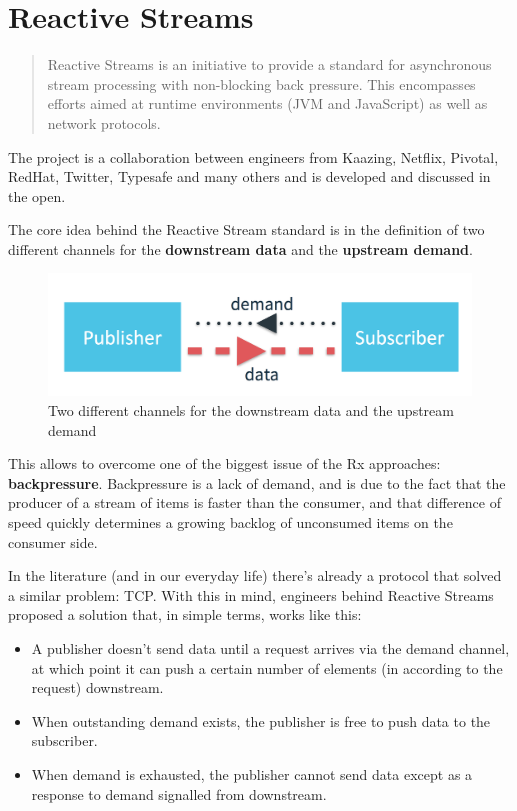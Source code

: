 \chapter{Reactive Streams}\label{reactive-streams}

\begin{quote}
Reactive Streams is an initiative to provide a standard for asynchronous
stream processing with non-blocking back pressure. This encompasses
efforts aimed at runtime environments (JVM and JavaScript) as well as
network protocols.
\end{quote}

The project is a collaboration between engineers from Kaazing, Netflix,
Pivotal, RedHat, Twitter, Typesafe and many others and is developed and
discussed in the open.

The core idea behind the Reactive Stream standard is in the definition
of two different channels for the \textbf{downstream data} and the
\textbf{upstream demand}.

\begin{figure}[htbp]
\centering
\includegraphics[scale=0.25]{imgs/stream.png}
\caption{Two different channels for the downstream data and the upstream
demand}
\end{figure}

This allows to overcome one of the biggest issue of the Rx approaches:
\textbf{backpressure}. Backpressure is a lack of demand, and is due to
the fact that the producer of a stream of items is faster than the
consumer, and that difference of speed quickly determines a growing
backlog of unconsumed items on the consumer side.

In the literature (and in our everyday life) there's already a protocol
that solved a similar problem: TCP. With this in mind, engineers behind
Reactive Streams proposed a solution that, in simple terms, works like
this:

\begin{itemize}
\itemsep1pt\parskip0pt
\item
  A publisher doesn't send data until a request arrives via the demand
  channel, at which point it can push a certain number of elements (in
  according to the request) downstream.
\item
  When outstanding demand exists, the publisher is free to push data to
  the subscriber.
\item
  When demand is exhausted, the publisher cannot send data except as a
  response to demand signalled from downstream.
\end{itemize}

